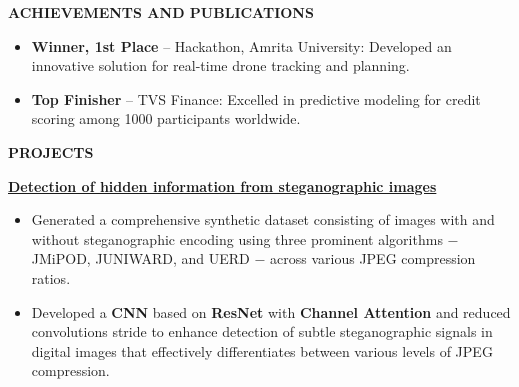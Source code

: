 \documentclass[10pt,a4]{article}
\begin{document}
{\begin{flushleft}
    {\Large \textbf{ACHIEVEMENTS AND PUBLICATIONS}}
      \begin{itemize}
            \item \textbf{Winner, 1st Place} – Hackathon, Amrita University: Developed an innovative solution for real-time drone tracking and planning.
            \item \textbf{Top Finisher} – TVS Finance: Excelled in predictive modeling for credit scoring among 1000 participants worldwide.
      \end{itemize}
\end{flushleft}

\begin{flushleft}
    {\Large \textbf{PROJECTS}}
        \vspace{0.5mm}
        \item \hspace{1.5mm} \textbf{\large \href{https://huggingface.co/spaces/narainp/Deep-Steganalysis-detector}{{Detection of hidden information from steganographic images}}}
        \vspace{0.25mm}
        \begin{itemize}
            \item Generated a comprehensive synthetic dataset consisting of images with and without steganographic encoding using three prominent algorithms $-$ JMiPOD, JUNIWARD, and UERD $-$ across various JPEG compression ratios.
            \item Developed a \textbf{CNN} based on \textbf{ResNet} with \textbf{Channel Attention} and reduced convolutions stride to enhance detection of subtle steganographic signals in digital images that effectively differentiates between various levels of JPEG compression.
            

\end{itemize}
\end{flushleft}}
\end{document}
